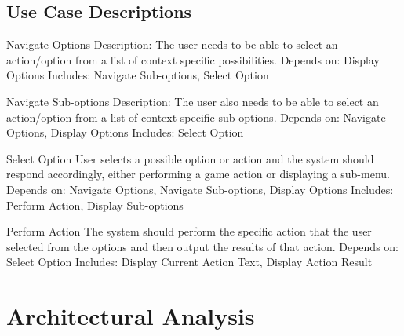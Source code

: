 \documentclass[11pt]{report}
\begin{document}
\subsection{Use Case Descriptions}
Navigate Options
Description: The user needs to be able to select an action/option from a list of context specific possibilities.
Depends on: Display Options
Includes: Navigate Sub-options, Select Option

Navigate Sub-options
Description: The user also needs to be able to select an action/option from a list of context specific sub options.
Depends on: Navigate Options, Display Options
Includes:  Select Option

Select Option
User selects a possible option or action and the system should respond accordingly, either performing a game action or displaying a sub-menu.
Depends on: Navigate Options, Navigate Sub-options, Display Options
Includes: Perform Action, Display Sub-options

Perform Action
The system should perform the specific action that the user selected from the options and then output the results of that action.
Depends on: Select Option
Includes: Display Current Action Text, Display Action Result

	
\section{Architectural Analysis}
\end{document}
